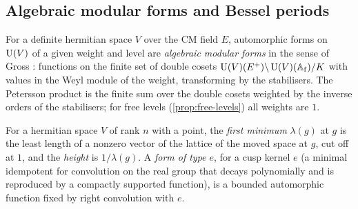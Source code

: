 \subsection{Algebraic modular forms and Bessel periods}\label{ss:B-bessel}
For a definite hermitian space $V$ over the CM field $E$, automorphic forms on $\operatorname{U}(V)$ of a given weight and level are
\emph{algebraic modular forms} in the sense of Gross \cite{Gross1999}: functions on the finite set of double cosets
$\operatorname{U}(V)(E^+)\backslash\operatorname{U}(V)(\mathbb{A}_{\mathrm f})/K$ with values in the Weyl module of the weight, transforming by the stabilisers. The
Petersson product is the finite sum over the double cosets weighted by the inverse orders of the stabilisers; for free levels
(\cref{prop:free-levels}) all weights are $1$.

For a hermitian space $V$ of rank $n$ with a point, the \emph{first minimum} $\lambda(g)$ at $g$ is the least length of a nonzero vector of the lattice of the moved space at $g$, cut off at $1$, and the
\emph{height} is $1/\lambda(g)$. A \emph{form of type $e$}, for a cusp kernel $e$ (a minimal idempotent for convolution on the real group that decays polynomially and is reproduced by a compactly supported
function), is a bounded automorphic function fixed by right convolution with $e$.

